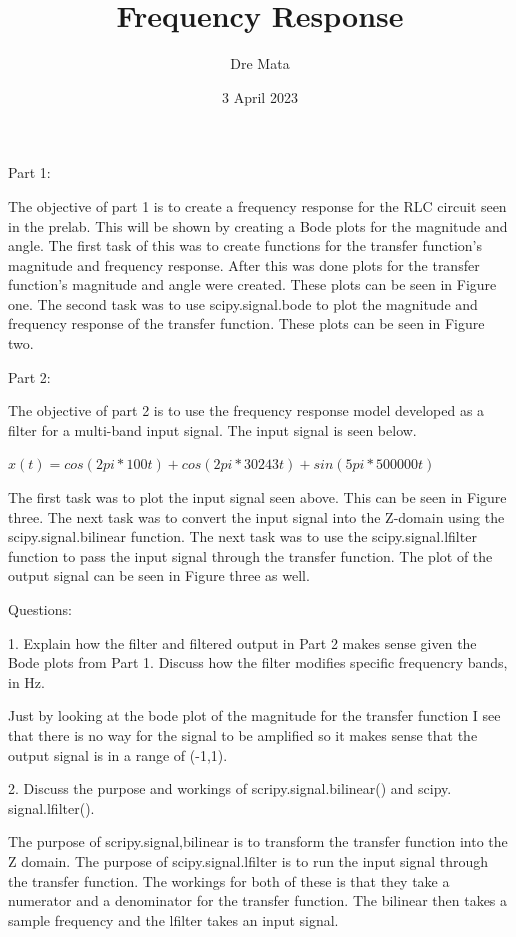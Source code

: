 \documentclass[nobib]{MSword}
\title{Frequency Response}
\author{Dre Mata}
\date{3 April 2023}
\begin{document}
\maketitle
\begin{center}
    Part 1:
\end{center}
The objective of part 1 is to create a frequency response for the RLC circuit seen in the prelab. This will be shown by creating a Bode plots for the magnitude and angle. The first task of this was to create functions for the transfer function's magnitude and frequency response. After this was done plots for the transfer function's magnitude and angle were created. These plots can be seen in Figure one. The second task was to use scipy.signal.bode to plot the magnitude and frequency response of the transfer function. These plots can be seen in Figure two.

\begin{center}
    Part 2:
\end{center}
The objective of part 2 is to use the frequency response model developed as a filter for a multi-band input signal. The input signal is seen below.

$ x(t) = cos(2pi * 100t) + cos(2pi * 30243t) + sin(5pi * 500000t)$

The first task was to plot the input signal seen above. This can be seen in Figure three. The next task was to convert the input signal into the Z-domain using the scipy.signal.bilinear function. The next task was to use the scipy.signal.lfilter function to pass the input signal through the transfer function. The plot of the output signal can be seen in Figure three as well.


\begin{center}
    Questions:
\end{center}

1. Explain how the filter and filtered output in Part 2 makes sense given the Bode plots from Part 1. Discuss how the filter modifies specific frequencry bands, in Hz.

Just by looking at the bode plot of the magnitude for the transfer function I see that there is no way for the signal to be amplified so it makes sense that the output signal is in a range of (-1,1). 

2. Discuss the purpose and workings of scripy.signal.bilinear() and scipy. signal.lfilter().

The purpose of scripy.signal,bilinear is to transform the transfer function into the Z domain. The purpose of scipy.signal.lfilter is to run the input signal through the transfer function. The workings for both of these is that they take a numerator and a denominator for the transfer function. The bilinear then takes a sample frequency and the lfilter takes an input signal.
\end{document}
